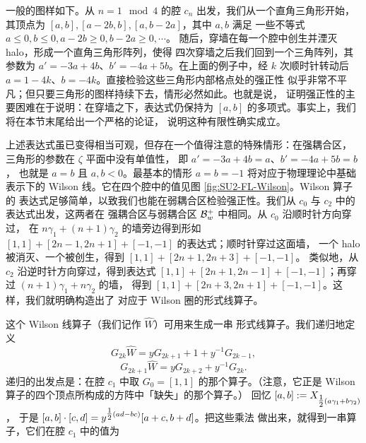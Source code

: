 一般的图样如下。从 $n=1 \mod 4$ 的腔 $c_n$ 出发，我们从一个直角三角形开始，
其顶点为 $[a,b], [a-2b,b], [a,b-2a]$，其中 $a,b$ 满足
一些不等式 $a\leq 0, b\leq 0, a-2b \geq 0, b-2a\geq 0, \cdots$。
随后，穿墙在每一个腔中创生并湮灭 halo，形成一个直角三角形阵列，使得
四次穿墙之后我们回到一个三角阵列，其参数为
$a' = - 3a +4 b$、$b' = -4 a + 5b$。在上面的例子中，经 $k$ 次顺时针转动后
$a= 1-4k$、$b= -4k$。直接检验这些三角形内部格点处的强正性
似乎非常不平凡；但只要三角形的图样持续下去，情形必然如此。也就是说，
证明强正性的主要困难在于说明：在穿墙之下，表达式仍保持为
$[a,b]$ 的多项式。事实上，我们将在本节末尾给出一个严格的论证，
说明这种有限性确实成立。


上述表达式虽已变得相当可观，但存在一个值得注意的特殊情形：在强耦合区，
三角形的参数在 $\zeta$ 平面中没有单值性，
即 $a' = -3a+4b = a $、$b' = -4a + 5 b = b$，
也就是 $a=b$ 且 $a,b<0$。最基本的情形 $a=b=-1$ 将对应于物理理论中基础表示下的 Wilson
线。它在四个腔中的值见图 \ref{fig:SU2-FL-Wilson}。Wilson 算子的
表达式足够简单，以致我们也能在弱耦合区检验强正性。我们从 $c_0$ 与 $c_2$ 中的表达式出发，这两者在
强耦合区与弱耦合区 $\mathcal{B}_w^+$ 中相同。从 $c_0$ 沿顺时针方向穿过，
在 $n\gamma_1 + (n+1)\gamma_2$ 的墙旁边得到形如 $[1,1]+[2n-1,2n+1] + [-1,-1]$ 的表达式；顺时针穿过这面墙，
一个 halo 被消灭、一个被创生，得到 $[1,1]+[2n+1,2n+3] + [-1,-1]$。
类似地，从 $c_2$ 沿逆时针方向穿过，得到表达式
$[1,1]+[2n+1,2n-1] + [-1,-1]$；再穿过 $(n+1)\gamma_1 + n\gamma_2$ 的墙，
得到 $[1,1]+[2n+3,2n+1] + [-1,-1]$。这样，我们就明确构造出了
对应于 Wilson 圈的形式线算子。

这个 Wilson 线算子（我们记作 $\hat W$）可用来生成一串
形式线算子。我们递归地定义
%
\begin{equation}\label{eq:rec-rels-1}
G_{2k} \hat W = y G_{2k+1} + 1 + y^{-1} G_{2k-1},
\end{equation}
\begin{equation}\label{eq:rec-rels-2}
G_{2k+1}\hat W = y G_{2k+2} + y^{-1} G_{2k}.
\end{equation}
%
递归的出发点是：在腔 $c_1$ 中取 $G_0 = [1,1]$ 的那个算子。（注意，它正是 Wilson
算子的四个顶点所构成的方阵中「缺失」的那个算子。）
回忆 $[a,b]:= X_{\tfrac{1}{2}(a \gamma_1 + b\gamma_2)}$，
于是 $[a,b]\cdot [c,d] = y^{\tfrac{1}{2}(ad-bc)} [a+c,b+d]$。把这些乘法
做出来，就得到一串算子，它们在腔 $c_1$ 中的值为


